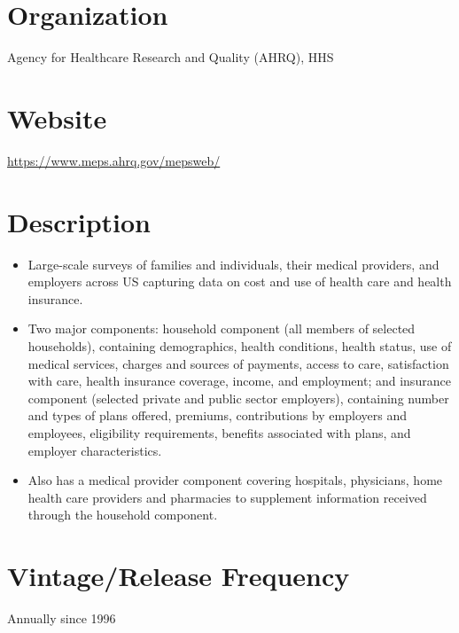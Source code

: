 \documentclass[
]{book}
\providecommand{\tightlist}{%
  \setlength{\itemsep}{0pt}\setlength{\parskip}{0pt}}
\begin{document}
\hypertarget{organization-37}{%
\section{Organization}\label{organization-37}}

Agency for Healthcare Research and Quality (AHRQ), HHS

\hypertarget{website-37}{%
\section{Website}\label{website-37}}

\url{https://www.meps.ahrq.gov/mepsweb/}

\hypertarget{description-37}{%
\section{Description}\label{description-37}}

\begin{itemize}
\tightlist
\item
  Large-scale surveys of families and individuals, their medical providers, and employers across US capturing data on cost and use of health care and health insurance.\\
\item
  Two major components: household component (all members of selected households), containing demographics, health conditions, health status, use of medical services, charges and sources of payments, access to care, satisfaction with care, health insurance coverage, income, and employment; and insurance component (selected private and public sector employers), containing number and types of plans offered, premiums, contributions by employers and employees, eligibility requirements, benefits associated with plans, and employer characteristics.\\
\item
  Also has a medical provider component covering hospitals, physicians, home health care providers and pharmacies to supplement information received through the household component.
\end{itemize}

\hypertarget{vintagerelease-frequency-37}{%
\section{Vintage/Release Frequency}\label{vintagerelease-frequency-37}}

Annually since 1996
\end{document}
